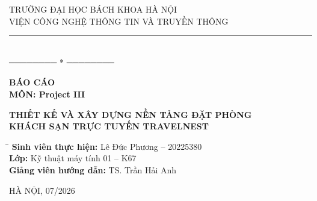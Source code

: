 \documentclass[13pt,a4paper,twoside]{report}
\begin{document}
\thispagestyle{empty}
\begin{center}
  \vspace*{1cm}
  {\fontsize{13}{16}\selectfont TRƯỜNG ĐẠI HỌC BÁCH KHOA HÀ NỘI}\\[4pt]
  {\fontsize{13}{16}\selectfont VIỆN CÔNG NGHỆ THÔNG TIN VÀ TRUYỀN THÔNG}\\[4pt]
  \rule{\textwidth}{1pt}\\[4pt]
  {\fontsize{13}{16}\selectfont ──────── * ────────}

  \vspace{3cm}

  {\fontsize{18}{22}\bfseries BÁO CÁO}\\[8pt]
  {\fontsize{14}{18}\bfseries MÔN: Project III}

  \vspace{2cm}

  {\fontsize{16}{20}\bfseries\MakeUppercase{Thiết kế và xây dựng nền tảng đặt phòng}\\}
  {\fontsize{16}{20}\bfseries\MakeUppercase{khách sạn trực tuyến TravelNest}}

  \vspace{2.5cm}

  \begin{tabbing}
    \hspace{4cm}\= \kill
    \textbf{Sinh viên thực hiện:} \> Lê Đức Phương -- 20225380 \\[6pt]
    \textbf{Lớp:} \> Kỹ thuật máy tính 01 -- K67 \\[6pt]
    \textbf{Giảng viên hướng dẫn:} \> TS. Trần Hải Anh
  \end{tabbing}

  \vspace{3cm}

  {\fontsize{13}{16}\selectfont HÀ NỘI, 07/2026}
\end{center}

\newpage
\end{document}
